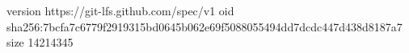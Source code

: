 version https://git-lfs.github.com/spec/v1
oid sha256:7bcfa7c6779f2919315bd0645b062e69f5088055494dd7dcdc447d438d8187a7
size 14214345
